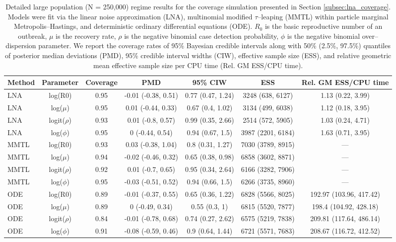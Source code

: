 \begin{sidewaystable}[ht]
	\small
	\centering
	\begin{tabular}{lcccccc}
		\hline
		Method & Parameter & Coverage & PMD & 95\% CIW & ESS & Rel. GM ESS/CPU time \\ 
		\hline
		LNA & log(R0) & 0.95 & -0.01 (-0.38, 0.51) & 0.77 (0.47, 1.24) & 3248 (638, 6127) & 1.13 (0.22, 3.99) \\ 
		LNA & log($\mu$) & 0.95 & 0.01 (-0.44, 0.33) & 0.67 (0.4, 1.02) & 3134 (499, 6038) & 1.12 (0.18, 3.95) \\ 
		LNA & logit($\rho$) & 0.93 & 0.01 (-0.8, 0.57) & 0.99 (0.35, 2.66) & 2514 (572, 5905) & 1.03 (0.24, 4.71) \\ 
		LNA & log($\phi$) & 0.95 & 0 (-0.44, 0.54) & 0.94 (0.67, 1.5) & 3987 (2201, 6184) & 1.63 (0.71, 3.95) \\ 
		MMTL & log(R0) & 0.93 & 0.03 (-0.38, 1.04) & 0.8 (0.31, 1.27) & 7030 (3789, 8915) & --- \\ 
		MMTL & log($\mu$) & 0.94 & -0.02 (-0.46, 0.32) & 0.65 (0.38, 0.98) & 6858 (3602, 8871) & --- \\ 
		MMTL & logit($\rho$) & 0.92 & 0.01 (-0.7, 0.65) & 0.95 (0.34, 2.64) & 6166 (3282, 7906) & --- \\ 
		MMTL & log($\phi$) & 0.95 & -0.03 (-0.51, 0.52) & 0.94 (0.66, 1.5) & 6266 (3735, 8960) & --- \\ 
		ODE & log(R0) & 0.89 & -0.01 (-0.37, 0.55) & 0.65 (0.36, 1.22) & 6828 (5566, 8025) & 192.97 (103.96, 417.42) \\ 
		ODE & log($\mu$) & 0.89 & 0 (-0.49, 0.34) & 0.55 (0.3, 1) & 6815 (5520, 7877) & 198.4 (104.92, 428.18) \\ 
		ODE & logit($\rho$) & 0.84 & -0.01 (-0.78, 0.68) & 0.74 (0.27, 2.62) & 6575 (5219, 7838) & 209.81 (117.64, 486.14) \\ 
		ODE & log($\phi$) & 0.91 & -0.08 (-0.59, 0.46) & 0.9 (0.64, 1.44) & 6721 (5571, 7683) & 208.67 (116.72, 412.52) \\ 
		\hline
	\end{tabular}
	\caption{Detailed large population (N = 250,000) regime results for the coverage simulation presented in Section \ref{subsec:lna_coverage}. Models were fit via the linear noise approximation (LNA), multinomial modified $ \tau $--leaping (MMTL) within particle marginal Metropolis--Hastings, and deterministic ordinary differential equations (ODE). $ R_0 $ is the basic reproductive number of an outbreak, $ \mu $ is the recovery rate, $ \rho $ is the negative binomial case detection probability, $ \phi $ is the negative binomial over--dispersion parameter. We report the coverage rates of 95\% Bayesian credible intervals along with 50\% (2.5\%, 97.5\%) quantiles of posterior median deviations (PMD), 95\% credible interval widths (CIW), effective sample size (ESS), and relative geometric mean effective sample size per CPU time (Rel. GM ESS/CPU time).}
\end{sidewaystable}	

